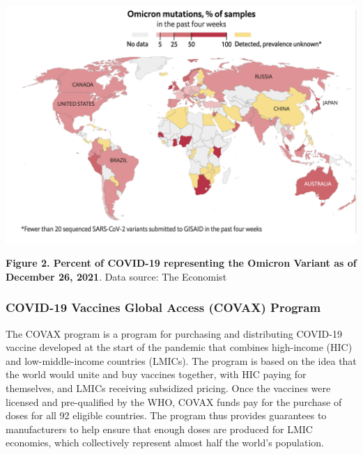 \documentclass[
  11pt,
  paper=a4,
  ,captions=tableheading
]{scrartcl}
\begin{document}
\includegraphics[width=6.25in,height=\textheight]{images/Omicron.png}

\textbf{Figure 2. Percent of COVID-19 representing the Omicron Variant
as of December 26, 2021}. Data source: The Economist

\hypertarget{covid-19-vaccines-global-access-covax-program}{%
\subsubsection*{COVID-19 Vaccines Global Access (COVAX)
Program}\label{covid-19-vaccines-global-access-covax-program}}

The COVAX program is a program for purchasing and distributing COVID-19
vaccine developed at the start of the pandemic that combines high-income
(HIC) and low-middle-income countries (LMICs). The program is based on
the idea that the world would unite and buy vaccines together, with HIC
paying for themselves, and LMICs receiving subsidized pricing. Once the
vaccines were licensed and pre-qualified by the WHO, COVAX funds pay for
the purchase of doses for all 92 eligible countries. The program thus
provides guarantees to manufacturers to help ensure that enough doses
are produced for LMIC economies, which collectively represent almost
half the world's population.
\end{document}
